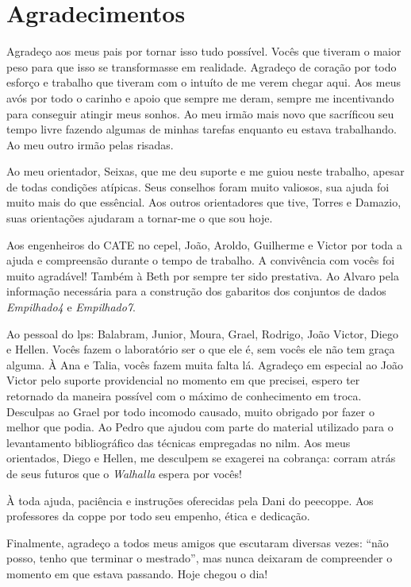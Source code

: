 \chapter*{Agradecimentos}

Agradeço aos meus pais por tornar isso tudo possível. Vocês que
tiveram o maior peso para que isso se transformasse em realidade.
Agradeço de coração por todo esforço e trabalho que tiveram com o
intuíto de me verem chegar aqui. Aos meus avós por todo o carinho e
apoio que sempre me deram, sempre me incentivando para conseguir
atingir meus sonhos. Ao meu irmão mais novo que sacríficou seu tempo
livre fazendo algumas de minhas tarefas enquanto eu estava
trabalhando. Ao meu outro irmão pelas risadas.

Ao meu orientador, Seixas, que me deu suporte e me guiou neste
trabalho, apesar de todas condições atípicas. Seus conselhos foram
muito valiosos, sua ajuda foi muito mais do que essêncial. Aos outros
orientadores que tive, Torres e Damazio, suas orientações ajudaram a
tornar-me o que sou hoje.

Aos engenheiros do CATE no \acl{cepel}, João, Aroldo, Guilherme e
Victor por toda a ajuda e compreensão durante o tempo de trabalho. A
convivência com vocês foi muito agradável! Também à Beth por sempre
ter sido prestativa. Ao Alvaro pela informação necessária
para a construção dos gabaritos dos conjuntos de dados
\emph{Empilhado4} e \emph{Empilhado7}.

Ao pessoal do \acs{lps}: Balabram, Junior, Moura, Grael, Rodrigo, João
Victor, Diego e Hellen. Vocês fazem o laboratório ser o que ele é, sem
vocês ele não tem graça alguma. À Ana e Talia, vocês fazem muita falta
lá. Agradeço em especial ao João Victor pelo suporte providencial no
momento em que precisei, espero ter retornado da maneira possível com
o máximo de conhecimento em troca. Desculpas ao Grael por todo
incomodo causado, muito obrigado por fazer o melhor que podia. Ao
Pedro que ajudou com parte do material utilizado para o
levantamento bibliográfico das técnicas empregadas no \acs{nilm}.
Aos meus orientados, Diego e Hellen, me desculpem se exagerei na
cobrança: corram atrás de seus futuros que o \emph{Walhalla} espera
por vocês!

À toda ajuda, paciência e instruções oferecidas pela Dani do
\acs{peecoppe}. Aos professores da \acs{coppe} por todo seu
empenho, ética e dedicação.

Finalmente, agradeço a todos meus amigos que escutaram diversas vezes:
``não posso, tenho que terminar o mestrado'', mas nunca deixaram de
compreender o momento em que estava passando. Hoje chegou o dia!


